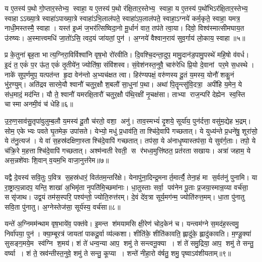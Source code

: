 य ए॒तस्य॑ प॒थो गो॒प्तार॒स्तेभ्य॒ स्वाहा॒ य ए॒तस्य॑ प॒थो र॑क्षि॒तार॒स्तेभ्य॒ स्वाहा॒ य ए॒तस्य॑ प॒थो॑भिऽर॑क्षि॒तार॒स्तेभ्य॒ स्वाहाऽऽख्या॒त्रे स्वाहा॑ऽपाख्या॒त्रे स्वाहा॑ऽभि॒लाल॑पते॒ स्वाहा॑ऽप॒लाल॑पते॒ स्वाहा॒ऽग्नये॑ कर्म॒कृते॒ स्वाहा॒ यमत्र॒ नाधी॒मस्तस्मै॒ स्वाहा। यस्त॑ इ॒ध्मं ज॒भर॑त्सिष्विदा॒नो मू॒र्धानं॑ वात॒ तप॑ते त्वा॒या। दिवो॒ विश्व॑स्मात्सीमघाय॒त उ॑रुष्यः। अ॒स्मात्त्वमधि॑ जा॒तो॑ऽसि॒ त्वद॒यं जा॑यतां॒ पुन॑। अ॒ग्नये॑ वैश्वान॒राय॑ सुव॒र्गाय॑ लो॒काय॒ स्वाहा॥५॥
\anuvakamend[य ए॒तस्य॒ त्वत्पञ्च॑]

प्र के॒तुना॑ बृह॒ता भात्य॒ग्निरा॒विर्विश्वा॑नि वृष॒भो रो॑रवीति। दि॒वश्चि॒दन्ता॒दुप॒ मामु॒दान॑ड॒पामु॒पस्थे॑ महि॒षो व॑वर्ध। इ॒दं त॒ एकं॑ प॒र ऊ॑त॒ एकं॑ तृ॒तीये॑न॒ ज्योति॑षा॒ संवि॑शस्व। सं॒वेश॑नस्त॒नुवै॒ चारु॑रेधि प्रि॒यो दे॒वानां पर॒मे स॒धस्थे। नाके॑ सुप॒र्णमुप॒ यत्पत॑न्त हृ॒दा वेन॑न्तो अ॒भ्यच॑क्षत त्वा। हिर॑ण्यपक्षं॒ वरु॑णस्य दू॒तं य॒मस्य॒ योनौ॑ शकु॒नं भु॑र॒ण्युम्। अति॑द्रव सारमे॒यौ श्वानौ॑ चतुर॒क्षौ श॒बलौ॑ सा॒धुना॑ प॒था। अथा॑ पि॒तॄन्त्सु॑वि॒दत्रा॒ अपी॑हि य॒मेन॒ ये स॑ध॒मादं॒ मद॑न्ति। यौ ते॒ श्वानौ॑ यमरक्षि॒तारौ॑ चतुर॒क्षौ प॑थि॒रक्षी॑ नृ॒चक्ष॑सा। ताभ्या राज॒न्परि॑ देह्येन स्व॒स्ति चास्मा अनमी॒वं च॑ धेहि॥६॥

उ॒रु॒ण॒साव॑सु॒तृपा॑वुलुम्ब॒लौ य॒मस्य॑ दू॒तौ च॑रतो॒ वशा॒ अनु॑। ताव॒स्मभ्यं॑ दृ॒शये॒ सूर्या॑य॒ पुन॑र्दत्ता॒ वसु॑म॒द्येह भ॒द्रम्। सोम॒ एकेभ्यः पवते घृ॒तमेक॒ उपा॑सते। येभ्यो॒ मधु॑ प्र॒धाव॑ति॒ ताश्चि॑दे॒वापि॑ गच्छतात्। ये युध्य॑न्ते प्र॒धने॑षु॒ शूरा॑सो॒ ये त॑नु॒त्यज॑। ये वा॑ स॒हस्र॑दक्षिणा॒स्ताश्चि॑दे॒वापि॑ गच्छतात्। तप॑सा॒ ये अ॑नाधृ॒ष्यास्तप॑सा॒ ये सुव॑र्ग॒ताः। तपो॒ ये च॑क्रि॒रे म॒हत्ताश्चि॑दे॒वापि॑ गच्छतात्। अश्म॑न्वती रेवती॒ स र॑भध्व॒मुत्ति॑ष्ठत॒ प्रत॑रता सखायः। अत्रा॑ जहाम॒ ये अस॒न्नशे॑वाः  शि॒वान् व॒यम॒भि वाजा॒नुत्त॑रेम॥७॥

यद्वै दे॒वस्य॑ सवि॒तुः प॒वित्र स॒हस्र॑धारं॒  वित॑तम॒न्तरि॑क्षे। येनापु॑ना॒दिन्द्र॒मनार्त॒मार्त्यै॒ तेना॒हं मा स॒र्वत॑नुं पुनामि। या रा॒ष्ट्रात्प॒न्नादप॒ यन्ति॒ शाखा॑ अ॒भिमृ॑ता नृ॒पति॑मि॒च्छमा॑नाः। धा॒तुस्ताः सर्वा॒ पव॑नेन पू॒ताः प्र॒जया॒स्मान्र॒य्या वर्च॑सा॒ ससृ॑जाथ। उद्व॒यं तम॑स॒स्परि॒ पश्य॑न्तो॒ ज्योति॒रुत्त॑रम्। दे॒वं दे॑व॒त्रा सूर्य॒मग॑न्म॒ ज्योति॑रुत्त॒मम्। धा॒ता पु॑नातु सवि॒ता पु॑नातु। अ॒ग्नेस्तेज॑सा॒ सूर्य॑स्य॒ वर्च॑सा॥८॥
\anuvakamend[धे॒ह्युत्त॑रेमा॒ष्टौ च॑]

यन्ते॑ अ॒ग्निमम॑न्थाम वृष॒भाये॑व॒ पक्त॑वे। इ॒मन्त श॑मयामसि क्षी॒रेण॑ चोद॒केन॑ च। यन्त्वम॑ग्ने स॒मद॑ह॒स्त्वमु॒ निर्वा॑पया॒ पुन॑। क्या॒म्बूरत्र॑ जायतां पाकदू॒र्वा व्य॑ल्कशा। शीति॑के॒ शीति॑कावति॒ ह्लादु॑के॒ ह्लादु॑कावति। म॒ण्डू॒क्या॑ सुसङ्ग॒मये॒म स्व॑ग्नि श॒मय॑। शं ते॑ धन्व॒न्या आप॒ शमु॑ ते सन्त्वनू॒क्या। शं ते॑ समु॒द्रिया॒ आप॒ शमु॑ ते सन्तु॒ वर्ष्या। शं ते॒ स्रव॑न्तीस्त॒नुवे॒ शमु॑ ते सन्तु॒ कूप्या। शन्ते॑ नीहा॒रो व॑र्\mbox{}षतु॒ शमु॒ पृष्वाऽव॑शीयताम्॥९॥

